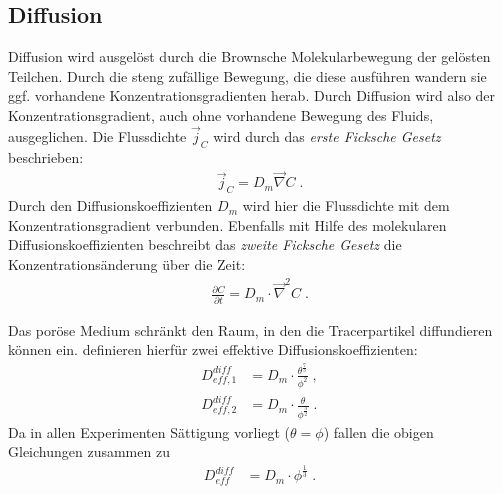 
\subsection{Diffusion}
\label{sec:diff}
Diffusion wird ausgelöst durch die Brownsche Molekularbewegung der gelösten Teilchen. Durch die steng zufällige Bewegung, die diese ausführen wandern sie ggf. vorhandene Konzentrationsgradienten herab. 
Durch Diffusion wird also der Konzentrationsgradient, auch ohne vorhandene Bewegung des Fluids, ausgeglichen. Die Flussdichte $\vec{j}_C$ wird durch das \textit{erste Ficksche Gesetz} beschrieben:
\begin{align}
 \vec{j}_C = D_m \vec{\nabla} C \; .
\end{align}
Durch den Diffusionskoeffizienten $D_m$ wird hier die Flussdichte mit dem Konzentrationsgradient verbunden.
Ebenfalls mit Hilfe des molekularen Diffusionskoeffizienten beschreibt das \textit{zweite Ficksche Gesetz} die Konzentrationsänderung über die Zeit:
\begin{align}
 \frac{\partial C}{\partial t} = D_m \cdot \vec{\nabla}^2 C \; .
 \label{eq:fick2}
\end{align}

Das poröse Medium schränkt den Raum, in den die Tracerpartikel diffundieren können ein. \cite{milli-quir} definieren hierfür zwei 
effektive Diffusionskoeffizienten:
\begin{align}
 D_{eff, 1}^{diff} &= D_m \cdot \frac{\theta^{\frac{7}{3}}}{\phi^2} \; , \\
 D_{eff, 2}^{diff} &= D_m \cdot \frac{\theta}{              \phi^\frac{3}{2}} \; .
\end{align}
Da in allen Experimenten Sättigung vorliegt \mbox{($\theta = \phi$)} fallen die obigen Gleichungen zusammen zu
\begin{align}
 D_{eff}^{diff} &= D_m \cdot \phi^{\frac{1}{3}} \; .
 \label{eq:Deff}
\end{align}

